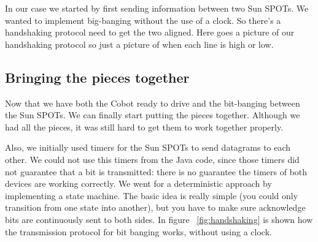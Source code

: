 \documentclass[a4paper,10pt]{article} %
\begin{document}
In our case we started by first sending information between two Sun SPOTs. We
wanted to implement big-banging without the use of a clock. So there's a
handshaking protocol need to get the two aligned. Here goes a picture of our
handshaking protocol so just a picture of when each line is high or low.


\subsection{Bringing the pieces together} %
\label{subsec:Bringing the pieces together}

Now that we have both the Cobot ready to drive and the bit-banging between the
Sun SPOTs. We can finally start putting the pieces together. Although we had all
the pieces, it was still hard to get them to work together properly.



Also, we initially used timers for the Sun SPOTs to send datagrams to each
other. We could not use this timers from the Java code, since those timers did
not guarantee that a bit is transmitted: there is no guarantee the timers of
both devices are working correctly. We went for a deterministic approach by
implementing a state machine. The basic idea is really simple (you could only
transition from one state into another), but you have to make sure acknowledge
bits are continuously sent to both sides. In figure ~\ref{fig:handshaking} is
shown how the transmission protocol for bit banging works, without using a
clock.
\end{document}
